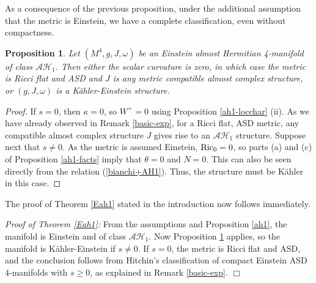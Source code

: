 \documentclass{amsart}
\newtheorem{prop}[theorem]{Proposition}
\begin{document}
\noindent
As a consequence of the previous proposition, under the additional assumption that the metric is Einstein, we have a complete classification, even without compactness.

\begin{prop} \label{Einst-loc}
Let $(M^4, g, J, \omega)$ be an Einstein almost Hermitian 4-manifold of class $\mathcal{AH}_1$. Then either the scalar curvature is zero, in which case the metric is Ricci flat and ASD and $J$ is any metric compatible almost complex structure, or $(g, J, \omega)$ is a K\"ahler-Einstein structure.  
\end{prop}

\begin{proof}
If $s = 0$, then $\kappa = 0$, so $W^+ =0$ using Proposition \ref{ah1-locchar} (ii). As we have already observed in Remark \ref{basic-exp}, for a Ricci flat, ASD metric, any compatible almost complex structure $J$ gives rise to an $\mathcal{AH}_1$ structure. Suppose next that $s \neq 0$. As the metric is assumed Einstein, ${\rm Ric}_0 = 0$, so parts (a) and (c) of Proposition \ref{ah1-facts} imply that $\theta = 0$ and $N=0$. This can also be seen directly from the relation (\ref{bianchi+AH1}). Thus, the structure must be K\"ahler in this case.    
\end{proof}
The proof of Theorem \ref{Eah1} stated in the introduction now follows immediately.

\vspace{0.2cm}
\noindent
{\it Proof of Theorem \ref{Eah1}:} From the assumptions and Proposition \ref{ah1}, the manifold is Einstein and of class $\mathcal{AH}_1$. Now Proposition \ref{Einst-loc} applies, so the manifold is K\"ahler-Einstein if $s\neq 0$. If $s=0$, the metric is Ricci flat and ASD, and the conclusion follows from Hitchin's classification of compact Einstein ASD 4-manifolds with $s\geq 0$, as explained in Remark \ref{basic-exp}. $\Box$
\end{document}
